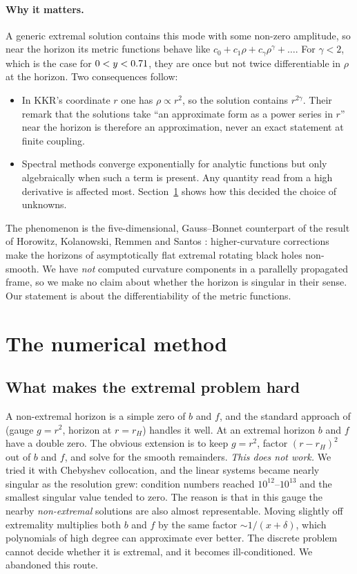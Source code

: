 \documentclass[11pt,a4paper]{article}
\begin{document}
\paragraph{Why it matters.} A generic extremal solution contains this mode with
some non-zero amplitude, so near the horizon its metric functions behave like
$c_0+c_1\rho+c_\gamma\rho^\gamma+\dots$. For $\gamma<2$, which is the case for
$0<y<0.71$, they are once but not twice differentiable in $\rho$ at
the horizon. Two consequences follow:
\begin{itemize}
\item In KKR's coordinate $r$ one has $\rho\propto r^2$, so the solution contains
$r^{2\gamma}$. Their remark that the solutions take ``an approximate form as a
power series in $r$'' near the horizon is therefore an approximation, never an
exact statement at finite coupling.
\item Spectral methods converge exponentially for analytic functions but only
algebraically when such a term is present. Any quantity read from a high
derivative is affected most. Section~\ref{sec:method} shows how this decided the
choice of unknowns.
\end{itemize}
The phenomenon is the five-dimensional, Gauss--Bonnet counterpart of the result
of Horowitz, Kolanowski, Remmen and Santos \cite{HKRS2023}: higher-curvature
corrections make the horizons of asymptotically flat extremal rotating black
holes non-smooth. We have \emph{not} computed curvature components in a parallelly
propagated frame, so we make no claim about whether the horizon is singular in
their sense. Our statement is about the differentiability of the metric functions.

\section{The numerical method}
\label{sec:method}

\subsection{What makes the extremal problem hard}

A non-extremal horizon is a simple zero of $b$ and $f$, and the standard approach
of \cite{BKKR2010} (gauge $g=r^2$, horizon at $r=r_H$) handles it well. At an
extremal horizon $b$ and $f$ have a double zero. The obvious extension is to keep
$g=r^2$, factor $(r-r_H)^2$ out of $b$ and $f$, and solve for the smooth
remainders. \emph{This does not work.} We tried it with Chebyshev collocation, and
the linear systems became nearly singular as the resolution grew: condition
numbers reached $10^{12}$--$10^{13}$ and the smallest singular value tended to
zero. The reason is that in this gauge the nearby \emph{non-extremal} solutions
are also almost representable. Moving slightly off extremality multiplies both $b$
and $f$ by the same factor $\sim1/(x+\delta)$, which polynomials of high degree
can approximate ever better. The discrete problem cannot decide whether it is
extremal, and it becomes ill-conditioned. We abandoned this route.
\end{document}
